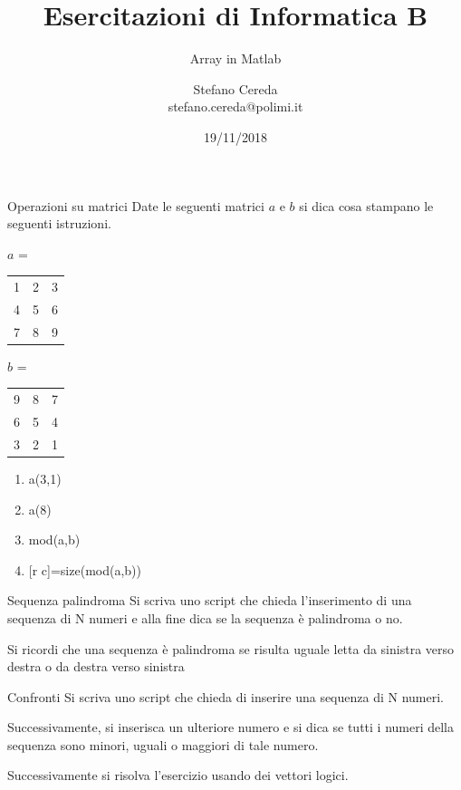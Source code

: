 \documentclass[aspectratio=169, handout]{beamer}
\title{Esercitazioni di Informatica B}
\subtitle{Array in Matlab}
\author{Stefano Cereda\\
	stefano.cereda@polimi.it
}
\date{19/11/2018}
\institute[PoliMi]{Politecnico Milano}
\begin{document}
\begin{frame}
	\maketitle
\end{frame}

\begin{frame}{Operazioni su matrici}
Date le seguenti matrici $a$ e $b$ si dica cosa stampano le seguenti istruzioni.

$a$ =
\begin{tabular}{|ccc|}
	\hline
	1&2&3\\
	4&5&6\\
	7&8&9\\
	\hline
\end{tabular}
\hspace{1cm}
$b$ =
\begin{tabular}{|ccc|}
	\hline
	9&8&7\\
	6&5&4\\
	3&2&1\\
	\hline
\end{tabular}

\begin{enumerate}
	\item a(3,1)
	\item a(8)
	\item mod(a,b)
	\item {[r c]}=size(mod(a,b))
\end{enumerate}

\end{frame}


\begin{frame}{Sequenza palindroma}
Si scriva uno script che chieda l’inserimento di una sequenza di N numeri e alla fine dica se la sequenza è palindroma o no.

Si ricordi che una sequenza è palindroma se risulta uguale letta da sinistra verso destra o da destra verso sinistra
\end{frame}

\begin{frame}{Confronti}
Si scriva uno script che chieda di inserire una sequenza di N numeri.

Successivamente, si inserisca un ulteriore numero e si dica se tutti i numeri della sequenza sono minori, uguali o maggiori di tale numero.

\pause
Successivamente si risolva l'esercizio usando dei vettori logici.
\end{frame}
\end{document}

